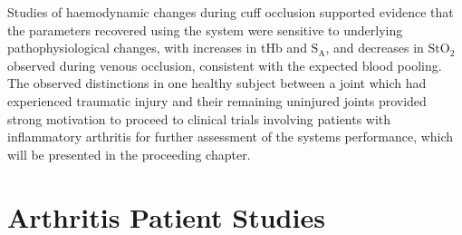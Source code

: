 \documentclass[twoside]{bhamthesis}
\theoremstyle{definition}
\begin{document}
Studies of haemodynamic changes during cuff occlusion supported evidence that the parameters recovered using the system were sensitive to underlying pathophysiological changes, with increases in tHb and $\mathrm{S_A}$, and decreases in  $\mathrm{StO_2}$ observed during venous occlusion, consistent with the expected blood pooling. The observed distinctions in one healthy subject between a joint which had experienced traumatic injury and their remaining uninjured joints provided strong motivation to proceed to clinical trials involving patients with inflammatory arthritis for further assessment of the systems performance, which will be presented in the proceeding chapter.




\chapter{Arthritis Patient Studies}
\label{chapter:Arthritis}
 
\end{document}
